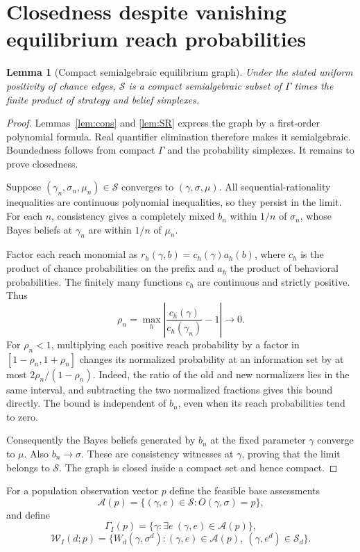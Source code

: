 \documentclass[11pt]{article}
\newtheorem{lemma}[theorem]{Lemma}
\theoremstyle{remark}\newtheorem{remark}[theorem]{Remark}
\begin{document}
\section*{Closedness despite vanishing equilibrium reach probabilities}
\begin{lemma}[Compact semialgebraic equilibrium graph]\label{lem:compact}
Under the stated uniform positivity of chance edges, $\mathcal S$ is a compact semialgebraic subset of $\Gamma$ times the finite product of strategy and belief simplexes.
\end{lemma}
\begin{proof}
Lemmas~\ref{lem:cons} and \ref{lem:SR} express the graph by a first-order polynomial formula. Real quantifier elimination therefore makes it semialgebraic. Boundedness follows from compact $\Gamma$ and the probability simplexes. It remains to prove closedness.

Suppose $(\gamma_n,\sigma_n,\mu_n)\in\mathcal S$ converges to $(\gamma,\sigma,\mu)$. All sequential-rationality inequalities are continuous polynomial inequalities, so they persist in the limit. For each $n$, consistency gives a completely mixed $b_n$ within $1/n$ of $\sigma_n$, whose Bayes beliefs at $\gamma_n$ are within $1/n$ of $\mu_n$.

Factor each reach monomial as $r_h(\gamma,b)=c_h(\gamma)a_h(b)$, where $c_h$ is the product of chance probabilities on the prefix and $a_h$ the product of behavioral probabilities. The finitely many functions $c_h$ are continuous and strictly positive. Thus
\[
 \rho_n=\max_h\left|\frac{c_h(\gamma)}{c_h(\gamma_n)}-1\right|\longrightarrow0.
\]
For $\rho_n<1$, multiplying each positive reach probability by a factor in $[1-\rho_n,1+\rho_n]$ changes its normalized probability at an information set by at most $2\rho_n/(1-\rho_n)$. Indeed, the ratio of the old and new normalizers lies in the same interval, and subtracting the two normalized fractions gives this bound directly. The bound is independent of $b_n$, even when its reach probabilities tend to zero.

Consequently the Bayes beliefs generated by $b_n$ at the fixed parameter $\gamma$ converge to $\mu$. Also $b_n\to\sigma$. These are consistency witnesses at $\gamma$, proving that the limit belongs to $\mathcal S$. The graph is closed inside a compact set and hence compact.
\end{proof}

For a population observation vector $p$ define the feasible base assessments
\[
 \mathcal A(p)=\{(\gamma,e)\in\mathcal S:O(\gamma,\sigma)=p\},
\]
and define
\[
 \Gamma_I(p)=\{\gamma:\exists e\ (\gamma,e)\in\mathcal A(p)\},
\]
\[
 \mathcal W_I(d;p)=\{W_d(\gamma,\sigma^d):
       (\gamma,e)\in\mathcal A(p),\ (\gamma,e^d)\in\mathcal S_d\}. \tag{3}
\]
\end{document}
